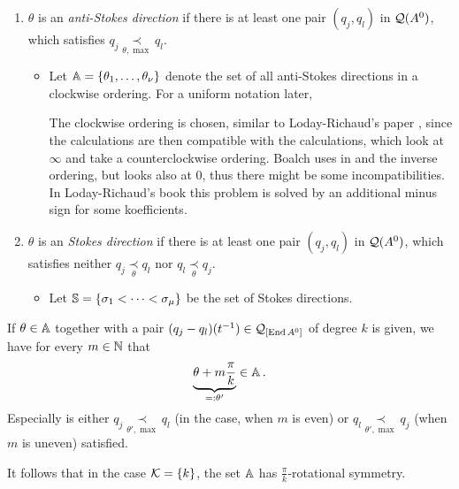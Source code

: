 \begin{defn}\label{defn:antiStokesDir}
  \begin{enumerate}
    \item $\theta$ is an \emph{anti-Stokes direction} if there is at least one
      pair $(q_j,q_l)$ in $\cQ(A^0)$, which satisfies
      $q_j \underset{\theta,\max}{\prec} q_l$.
      \begin{itemize}
        \item Let $\A=\{\theta_1,\dots,\theta_{\nu}\}$ denote the set of all
          anti-Stokes directions in a clockwise ordering. For a uniform
          notation later, 
          \begin{s-rem}
            The clockwise ordering is chosen, similar to Loday-Richaud's paper
            \cite{Loday1994}, since the calculations are then compatible with
            the calculations, which look at $\infty$ and take a
            counterclockwise ordering.
            Boalch uses in \cite{boalch} and \cite{thboalch} the inverse
            ordering, but looks also at $0$, thus there might be some
            incompatibilities.
            In Loday-Richaud's book \cite{Loday2014} this problem is solved by
            an additional minus sign for some koefficients.
          \end{s-rem}
      \end{itemize}
    \item $\theta$ is an \emph{Stokes direction} if there is at least one pair
      $(q_j,q_l)$ in $\cQ(A^0)$, which satisfies neither
      $q_j\underset{\theta}{\prec} q_l$ nor $q_l\underset{\theta}{\prec} q_j$.
      \begin{itemize}
        \item Let $\S=\{\sigma_1<\cdots<\sigma_\mu\}$ be the set of Stokes
          directions.
      \end{itemize}
  \end{enumerate}
\end{defn}
\begin{lem}\label{lem:rotationalSym}%
  If $\theta\in\A$ together with a pair $(q_j-q_l)(t^{-1})\in\cQ_{[\End A^0]}$
  of degree $k$ is given, we have for every $m\in\N$ that
  \[
    \underset{=:\theta'}{\underbrace{\theta+m\frac{\pi}{k}}} \in \A \,.
  \]
  Especially is either $q_j \underset{\theta',\max}{\prec} q_l$ (in the
  case, when $m$ is even) or $q_l \underset{\theta',\max}{\prec} q_j$
  (when $m$ is uneven) satisfied.
  \begin{s-cor}
    It follows that in the case $\cK=\{k\}$, the set $\A$ has
    $\frac{\pi}{k}$-rotational symmetry.
  \end{s-cor}
\end{lem}
